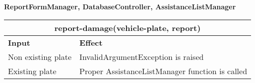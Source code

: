 \begin{Large}
\end{Large}

\textbf{ReportFormManager, DatabaseController, AssistanceListManager} \\
\begin{tabular}{|p{5cm}|p{7cm}|}
\hline
\multicolumn{2}{|c|}{report-damage(vehicle-plate, report)} \\
\hline
\textbf{Input} & \textbf{Effect} \\

\hline
Non existing plate & InvalidArgumentException is raised \\

\hline
Existing plate & Proper AssistanceListManager function is called \\
\hline
\end{tabular}